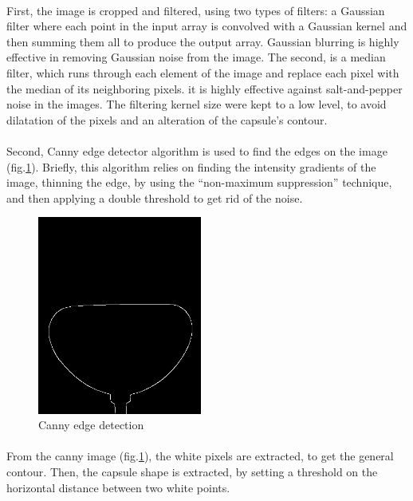 \paragraph{}
First, the image is cropped and filtered, using two types of filters: a Gaussian filter where each point in the input array is convolved with a Gaussian kernel and then summing them all to produce the output array. Gaussian blurring is highly effective in removing Gaussian noise from the image. The second, is a median filter, which runs through each element of the image and replace each pixel with the median of its neighboring pixels. it is highly effective against salt-and-pepper noise in the images.
The filtering kernel size were kept to a low level, to avoid dilatation of the pixels and an alteration of the capsule's contour.

\paragraph{}
Second, Canny edge detector algorithm\cite{canny} is used to find the edges on the image (fig.\ref{fig:canny}). Briefly, this algorithm relies on finding the intensity gradients of the image, thinning the edge, by using the "`non-maximum suppression"' technique, and then applying a double threshold to get rid of the noise.
\begin{figure}[H] %
	\centering%
  \includegraphics[width=0.48\textwidth]{figures/Chapter_1/canny.png}
	\caption{Canny edge detection}
	\label{fig:canny}
\end{figure}
\paragraph{}
From the canny image (fig.\ref{fig:canny}), the white pixels are extracted, to get the general contour. Then, the capsule shape is extracted, by setting a threshold on the horizontal distance between two white points.

